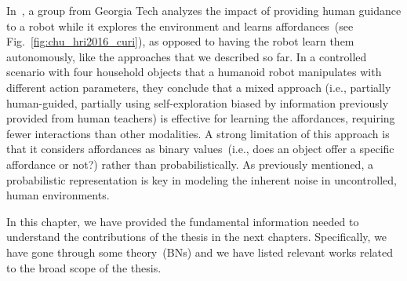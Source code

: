 In~\cite{chu:2016:hri}, a group from Georgia Tech analyzes the impact of providing human guidance to a robot while it explores the environment and learns affordances~(see Fig.~\ref{fig:chu_hri2016_curi}), as opposed to having the robot learn them autonomously, like the approaches that we described so far.
In a controlled scenario with four household objects that a humanoid robot manipulates with different action parameters, they conclude that a mixed approach (i.e., partially human-guided, partially using self-exploration biased by information previously provided from human teachers) is effective for learning the affordances, requiring fewer interactions than other modalities.
A strong limitation of this approach is that it considers affordances as binary values~(i.e., does an object offer a specific affordance or not?) rather than probabilistically.
As previously mentioned, a probabilistic representation is key in modeling the inherent noise in uncontrolled, human environments.

\bigskip

In this chapter, we have provided the fundamental information needed to understand the contributions of the thesis in the next chapters.
Specifically,
we have gone through some theory~(\aclp{BN}) and
we have listed relevant works related to the broad scope of the thesis.
